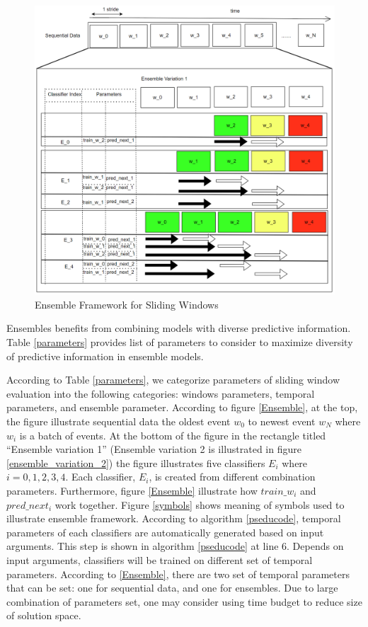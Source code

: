 \documentclass{IEEEtran}
\begin{document}
\begin{figure}[htbp]
\centering
\includegraphics[width=.9\linewidth]{./images/screenshot_20220425_110609.png}
\caption{\label{Ensemble Framework for Sliding Windows}Ensemble Framework for Sliding Windows}
\end{figure}

Ensembles benefits from combining models with diverse predictive information. Table \ref{parameters} provides list of parameters to consider to maximize diversity of predictive information in ensemble models.

According to Table \ref{parameters}, we categorize parameters of sliding window evaluation into the following categories: windows parameters, temporal parameters, and ensemble parameter. According to figure \ref{Ensemble}, at the top, the figure illustrate sequential data the oldest event \(w_0\) to newest event \(w_{N}\) where \(w_{i}\) is a batch of events. At the bottom of the figure in the rectangle titled ``Ensemble variation 1'' (Ensemble variation 2 is illustrated in figure \ref{ensemble_variation_2}) the figure illustrates five classifiers \(E_i\) where \(i = 0,1,2,3,4\). Each classifier, \(E_i\), is created from different combination parameters. Furthermore, figure \ref{Ensemble} illustrate how \(train\_w_{i}\) and \(pred\_next_{i}\) work together. Figure \ref{symbols} shows meaning of symbols used to illustrate ensemble framework. According to algorithm \ref{pseducode}, temporal parameters of each classifiers are automatically generated based on input arguments. This step is shown in algorithm \ref{pseducode} at line 6. Depends on input arguments, classifiers will be trained on different set of temporal parameters. According to \ref{Ensemble}, there are two set of temporal parameters that can be set: one for sequential data, and one for ensembles. Due to large combination of parameters set, one may consider using time budget to reduce size of solution space.
\end{document}
